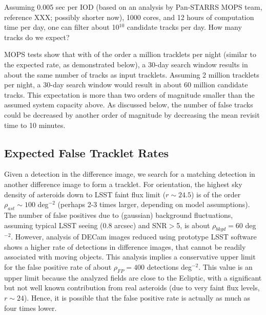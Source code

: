 Assuming 0.005 sec per IOD (based on an analysis by Pan-STARRS MOPS team,
reference XXX; possibly shorter now), 1000 cores, and 12 hours of computation time 
per day, one can filter about 10$^{10}$ candidate tracks per day. How many tracks 
do we expect? 

MOPS tests show that with of the order a million tracklets per night (similar to 
the expected rate, as demonstrated below), a 30-day search window results in 
about the same number of tracks as input tracklets. Assuming 2 million tracklets
per night, a 30-day search window would result in about 60 million candidate
tracks. This expectation is more than two orders of magnitude smaller than the 
assumed system capacity above. As discussed below, the number of false tracks
could be decreased by another order of magnitude by decreasing the mean revisit
time to 10 minutes. 


\subsection{Expected False Tracklet Rates} 


Given a detection in the difference image, we search for a matching detection in another
difference image to form a tracklet. For orientation, the highest sky density of asteroids 
down to LSST faint flux limit ($r \sim 24.5$) is of the order $\rho_{ast} \sim 100$ deg$^{-2}$
(perhaps 2-3 times larger, depending on model assumptions). The number of false positives 
due to (gaussian) background fluctuations, assuming typical LSST seeing (0.8 arcsec) and
SNR$>$5, is about $\rho_{bkgd} = 60$ deg$^{-2}$. However, analysis of DECam images reduced 
using prototype LSST software shows a higher rate of detections in difference images, that 
cannot be readily associated with moving objects. This analysis implies a conservative upper
limit for the false positive rate of about $\rho_{FP} =  400$ detections deg$^{-2}$. This value 
is an upper limit because the analyzed fields are close to the Ecliptic, with a significant but
not well known contribution from real asteroids (due to very faint flux levels, $r \sim 24$). 
Hence, it is possible that the false positive rate is actually as much as four times lower. 

